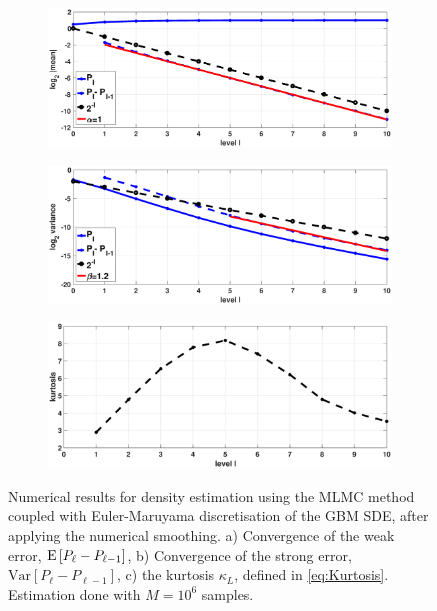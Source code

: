 \begin{figure}[htb]
	\centering %
	\begin{subfigure}{0.5\textwidth}
		\includegraphics[width=\linewidth]{./figures/MLMC_density_GBM_estimation/density_L0_2_L_10_N_10_5/density_GBM_L_0_2_steps_L_10_N_10_5_weak}
		\caption{}
		\label{fig:GBM_density_weak}
	\end{subfigure}\hfil %
	\begin{subfigure}{0.5\textwidth}
		\includegraphics[width=\linewidth]{./figures/MLMC_density_GBM_estimation/density_L0_2_L_10_N_10_5/density_GBM_L_0_2_steps_L_10_N_10_5_strong}
		\caption{}
		\label{fig:GBM_density_strong}
	\end{subfigure}\hfil %
	\begin{subfigure}{0.5\textwidth}
		\includegraphics[width=\linewidth]{./figures/MLMC_density_GBM_estimation/density_L0_2_L_10_N_10_5/density_GBM_L_0_2_steps_L_10_N_10_5_kurt}
		\caption{}
		\label{fig:GBM_density_kurt}
	\end{subfigure}
	\caption{Numerical results for  density estimation  using the MLMC method coupled with Euler-Maruyama discretisation of the GBM SDE, after applying  the numerical smoothing. a) Convergence of  the weak error, $\mathrm{E}\left[P_{\ell}-P_{\ell-1}\right]$, b) Convergence of  the strong error, $\text{Var}\left[P_{\ell}-P_{\ell-1}\right]$, c) the kurtosis $\kappa_{L}$, defined in \eqref{eq:Kurtosis}.  Estimation done with $M=10^6$ samples.}
	\label{fig:outputs_GBM_density}	
\end{figure}
\FloatBarrier

